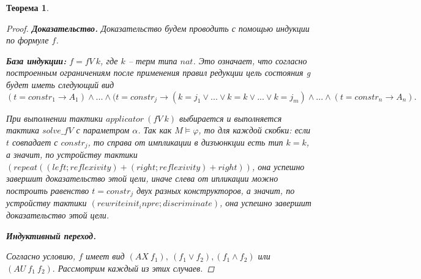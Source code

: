 \documentclass[12pt]{article}
\newtheorem{theorem}{Теорема}
\begin{document}
\begin{theorem}


\begin{proof} \textbf{Доказательство.}
Доказательство будем проводить с помощью индукции по формуле $f$.

\textbf{База индукции:} $f = fV\ k$, где $k$ -- терм типа $nat$. Это означает, что согласно построенным ограничениям после применения правил редукции цель состояния g будет иметь следующий вид 
$$(t=constr_1 \xrightarrow{} A_1) \wedge ... \wedge (t=constr_j \xrightarrow{} (k=j_{1} \vee ...\vee k=k \vee ...\vee k=j_{m}) \wedge ... \wedge(t=constr_n \xrightarrow{} A_n).$$


При выполнении тактики $applicator\ (fV\ k)$ выбирается и выполняется тактика $solve\_fV$ с параметром $\alpha$. Так как $M \models \varphi$, то для каждой скобки: если $t$ совпадает с $constr_j$, то справа от импликации в дизъюнкции есть тип $k=k$, а значит, по устройству тактики $( repeat ( (left; reflexivity) + (right; reflexivity) + right) )$, она успешно завершит доказательство этой цели, иначе слева от ипликации можно построить равенство $t=constr_j$ двух разных конструкторов, а значит, по устройству тактики $( rewrite init_ in pre; discriminate )$, она успешно завершит доказательство этой цели.


\textbf{Индуктивный переход.}

Согласно условию, $f$ имеет вид $(AX\ f_1),\ (f_1 \vee f_2),(f_1 \wedge f_2)$ или $(AU\ f_1 \ f_2).$ 
Рассмотрим каждый из этих случаев.


\end{proof}
\end{theorem}
\end{document}
